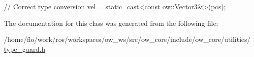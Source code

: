 \begin{DoxyCode}
\textcolor{comment}{// Correct type conversion}
vel = \textcolor{keyword}{static\_cast<}\textcolor{keyword}{const }\hyperlink{classow__core_1_1Vector3}{ow::Vector3}&\textcolor{keyword}{>}(pos);
\end{DoxyCode}
 

The documentation for this class was generated from the following file\+:\begin{DoxyCompactItemize}
\item 
/home/flo/work/ros/workspaces/ow\+\_\+ws/src/ow\+\_\+core/include/ow\+\_\+core/utilities/\hyperlink{type__guard_8h}{type\+\_\+guard.\+h}\end{DoxyCompactItemize}
